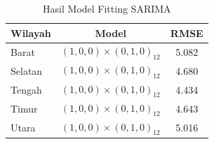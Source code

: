 \begin{table}[H]
    \centering
    \caption{Hasil Model Fitting SARIMA}
    \label{table:hasil-model-fitting-arima}
    \renewcommand{\arraystretch}{1.2}
    \begin{tabular}{lcc}
        \toprule
        \textbf{Wilayah} & \textbf{Model} & \textbf{RMSE} \\ 
        \midrule
        Barat   & $(1,0,0) \times (0,1,0)_{12}$ & 5.082 \\
        Selatan & $(1,0,0) \times (0,1,0)_{12}$ & 4.680 \\
        Tengah  & $(1,0,0) \times (0,1,0)_{12}$ & 4.434 \\
        Timur   & $(1,0,0) \times (0,1,0)_{12}$ & 4.643 \\
        Utara   & $(1,0,0) \times (0,1,0)_{12}$ & 5.016 \\
        \bottomrule
    \end{tabular}
\end{table}